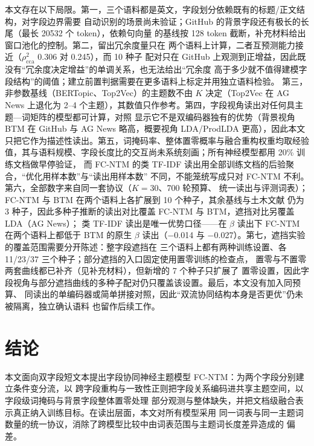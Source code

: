 \documentclass[11pt]{ctexart}
\newcommand{\fcntm}{FC-NTM}
\begin{document}
本文存在以下局限。第一，三个语料都是英文，字段划分依赖既有的标题/正文结构，对字段边界需要
自动识别的场景尚未验证；GitHub 的背景字段还有极长的长尾（最长 20532 个 token），依赖句向量
的基线按 128 token 截断，补充材料给出窗口池化的控制。第二，留出冗余度量只在
两个语料上计算，二者互预测能力接近（$\rho^2_{\mathrm{cca}}$ 0.306 对 0.245），而 10 种子
配对只在 GitHub 上观测到正增益，因此既没有“冗余度决定增益”的单调关系，也无法给出“冗余度
高于多少就不值得建模字段结构”的阈值；建立前置判据需要在更多语料上标定并用独立语料检验。
第三，非参数基线（BERTopic、Top2Vec）的主题数不由 $K$ 决定（Top2Vec 在 AG News 上退化为
2--4 个主题），其数值只作参考。第四，字段视角读出对任何具主题—词矩阵的模型都可计算，对照
显示它不是双编码器独有的优势（背景视角 BTM 在 GitHub 与 AG News 略高，概要视角 LDA/ProdLDA
更高），因此本文只把它作为描述性读出。第五，词掩码率、整体置零概率与融合重构权重均取经验
值，其与语料规模、字段长度比的交互尚未系统刻画；所有神经模型都用 20\% 训练文档做早停验证，
而 \fcntm{} 的类 TF-IDF 读出用全部训练文档的后验聚合，“优化用样本数”与“读出用样本数”
不同，不能笼统写成只对 \fcntm{} 不利。第六，全部数字来自同一套协议（$K=30$、700 轮预算、
统一读出与评测词表）；\fcntm{} 与 BTM 在两个语料上各扩展到 10 个种子，其余基线与土木文献
仍为 3 种子，因此多种子推断的读出对比覆盖 \fcntm{} 与 BTM，遮挡对比另覆盖 LDA（AG News）；
类 TF-IDF 读出是唯一优势口径——在 $\beta$ 读出下 \fcntm{} 在两个语料上都低于 BTM 的原生
$\beta$ 读出（$-$0.014 与 $-$0.027）。第七，遮挡实验的覆盖范围需要分开陈述：整字段遮挡在
三个语料上都有两种训练设置、各 11/23/37 三个种子；部分遮挡的入口固定使用置零训练的检查点，
置零与不置零两套曲线都已补齐（见补充材料），但新增的 7 个种子只扩展了
置零设置，因此字段视角与部分遮挡曲线的多种子配对仍只覆盖该设置。最后，本文没有加入同预算、
同读出的单编码器或简单拼接对照，因此“双流协同结构本身是否更优”仍未被隔离，独立确认语料
也留作后续工作。

\section{结论}

本文面向双字段短文本提出字段协同神经主题模型 \fcntm：为两个字段分别建立条件变分流，以
跨字段重构与一致性正则把字段关系编码进共享主题空间，以字段级词掩码与背景字段整体置零处理
部分观测与整体缺失，并把文档级融合表示真正纳入训练目标。在读出层面，本文对所有模型采用
同一词表与同一主题词数量的统一协议，消除了跨模型比较中由词表范围与主题词长度差异造成的
偏差。
\end{document}

